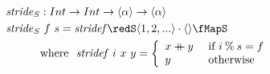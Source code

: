\documentclass[preview]{standalone}
\begin{document}
\begin{align*}
  \mathit{stride}_S &: Int \rightarrow Int \rightarrow \vect{\alpha} \rightarrow \vect{\alpha} \\
  \mathit{stride}_S &\ f\ s = \mathit{stridef} \redS \vect{1,2,...} \cdot \vect{} \fMapS\\
         & \text{where}\ \ \mathit{stridef}\ i\ x\ y = 
           \left\{\begin{array}{ll}
                    x \fcat y & \text{ if } i \mathbin{\%} s = f\\
                     y & \text{ otherwise}
                  \end{array}
           \right.\\
\end{align*}
\end{document}
